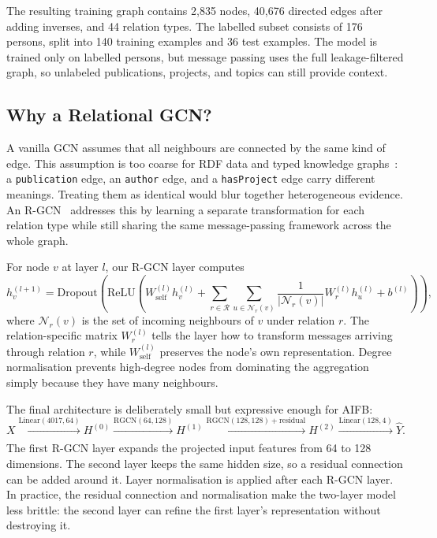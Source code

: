 \documentclass[runningheads]{llncs}
\begin{document}
The resulting training graph contains 2,835 nodes, 40,676 directed edges after adding inverses, and 44
relation types.  The labelled subset consists of 176 persons, split into 140 training examples and 36 test
examples.  The model is trained only on labelled persons, but message passing uses the full leakage-filtered
graph, so unlabeled publications, projects, and topics can still provide context.

\subsection{Why a Relational GCN?}

A vanilla GCN assumes that all neighbours are connected by the same kind of edge.  This assumption is too
coarse for RDF data and typed knowledge graphs~\cite{xai26xgnn}: a \texttt{publication} edge, an \texttt{author} edge, and a \texttt{hasProject} edge
carry different meanings.  Treating them as identical would blur together heterogeneous evidence.  An
R-GCN~\cite{schlichtkrull2018} addresses this by learning a separate transformation for each relation type while still sharing the
same message-passing framework across the whole graph.

For node $v$ at layer $l$, our R-GCN layer computes
\[
h_v^{(l+1)} =
\mathrm{Dropout}\!\left(
\mathrm{ReLU}\!\left(
W_{\mathrm{self}}^{(l)} h_v^{(l)}
  + \sum_{r \in \mathcal{R}} \sum_{u \in \mathcal{N}_r(v)}
    \frac{1}{|\mathcal{N}_r(v)|} W_r^{(l)} h_u^{(l)}
  + b^{(l)}
\right)\right),
\]
where $\mathcal{N}_r(v)$ is the set of incoming neighbours of $v$ under relation $r$.
The relation-specific matrix $W_r^{(l)}$ tells the layer how to transform messages arriving through
relation $r$, while $W_{\mathrm{self}}^{(l)}$ preserves the node's own representation.  Degree
normalisation prevents high-degree nodes from dominating the aggregation simply because they have many
neighbours.

The final architecture is deliberately small but expressive enough for AIFB:
\[
X \xrightarrow[]{\mathrm{Linear}(4017,64)}
H^{(0)} \xrightarrow[]{\mathrm{RGCN}(64,128)}
H^{(1)} \xrightarrow[]{\mathrm{RGCN}(128,128)+\mathrm{residual}}
H^{(2)} \xrightarrow[]{\mathrm{Linear}(128,4)}
\hat{Y}.
\]
The first R-GCN layer expands the projected input features from 64 to 128 dimensions.  The second layer
keeps the same hidden size, so a residual connection can be added around it.  Layer normalisation is applied
after each R-GCN layer.  In practice, the residual connection and normalisation make the two-layer model
less brittle: the second layer can refine the first layer's representation without destroying it.
\end{document}
